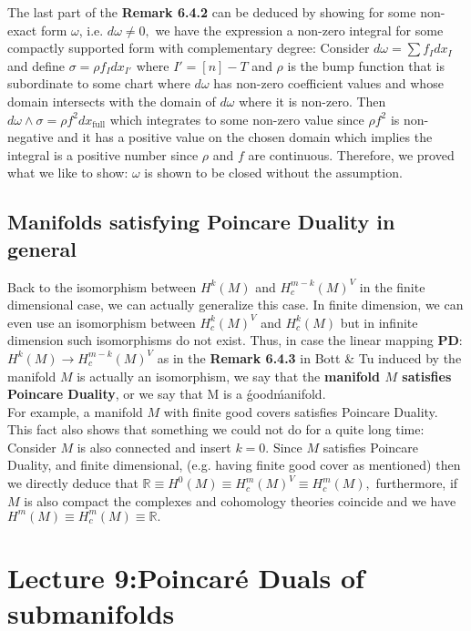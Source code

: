 \documentclass[12pt]{amsart}
\theoremstyle{remark}
\begin{document}
\indent \indent The last part of the \textbf{Remark 6.4.2} can be deduced by showing for some non-exact form $\omega$, i.e. $d\omega \neq 0,$ we have the expression a non-zero integral  for some compactly supported form with complementary degree: Consider $d\omega = \sum f_I dx_I$ and define $\sigma = \rho f_I dx_{I'}$ where $I' = [n] - T$ and $\rho$ is the bump function that is subordinate to some chart where $d\omega$ has non-zero coefficient values and whose domain intersects with the domain of $d\omega$ where it is non-zero. Then $d\omega\wedge\sigma = \rho f^2 dx_{\text{full}}$ which integrates to some non-zero value since $\rho f^2$ is non-negative and it has a positive value on the chosen domain which implies the integral is a positive number since $\rho$ and $f$ are continuous. Therefore, we proved what we like to show: $\omega$ is shown to be closed without the assumption.
\subsection{Manifolds satisfying Poincare Duality in general} 

\indent \indent Back to the isomorphism between $H^k (M)$ and $H_c^{m-k} (M)^V$ in the finite dimensional case, we can actually generalize this case. In finite dimension, we can even use an isomorphism between $H_c^k(M)^V$ and $H_c^k(M)$ but in infinite dimension such isomorphisms do not exist. Thus, in case the linear mapping \textbf{PD}: $H^k(M) \rightarrow H_c^{m-k}(M)^V$ as in the \textbf{Remark 6.4.3} in Bott \& Tu induced by the manifold $M$ is actually an isomorphism, we say that the \textbf{manifold $M$ satisfies Poincare Duality}, or we say that M is a \'good\' manifold. \\ 
\indent For example, a manifold $M$ with finite good covers satisfies Poincare Duality. This fact also shows that something we could not do for a quite long time: Consider $M$ is also connected and insert $k = 0$. Since $M$ satisfies Poincare Duality, and finite dimensional, (e.g. having finite good cover as mentioned) then we directly deduce that $\mathbb{R} \equiv H^0(M) \equiv H_c ^m (M)^V \equiv H_c^m (M),$ furthermore, if $M$ is also compact the complexes and cohomology theories coincide and we have $H^m(M) \equiv H_c^m (M) \equiv \mathbb{R}.$

\section{Lecture 9:Poincaré Duals of submanifolds}
\end{document}
